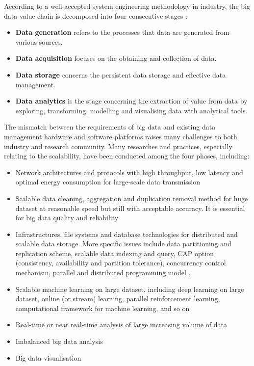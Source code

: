\documentclass[conference]{IEEEtran}
\providecommand{\tightlist}{%
  \setlength{\itemsep}{0pt}\setlength{\parskip}{0pt}
}
\begin{document}
According to a well-accepted system engineering methodology in industry,
the big data value chain is decomposed into four consecutive stages
\autocite{hu2014}:

\begin{itemize}
\tightlist
\item
  \textbf{Data generation} refers to the processes that data are
  generated from various sources.
\item
  \textbf{Data acquisition} focuses on the obtaining and collection of
  data.
\item
  \textbf{Data storage} concerns the persistent data storage and
  effective data management.
\item
  \textbf{Data analytics} is the stage concerning the extraction of
  value from data by exploring, transforming, modelling and visualising
  data with analytical tools.
\end{itemize}

The mismatch between the requirements of big data and existing data
management hardware and software platforms raises many challenges to
both industry and research community. Many researches and practices,
especially relating to the scalability, have been conducted among the
four phases, including:

\begin{itemize}
\tightlist
\item
  Network architectures and protocols with high throughput, low latency
  and optimal energy consumption for large-scale data transmission
  \autocite{hu2014}
\item
  Scalable data cleaning, aggregation and duplication removal method for
  huge dataset at reasonable speed but still with acceptable accuracy.
  It is essential for big data quality and reliability
  \autocite{hu2014,OUSSOUS2018431}
\item
  Infrastructures, file systems and database technologies for
  distributed and scalable data storage. More specific issues include
  data partitioning and replication scheme, scalable data indexing and
  query, CAP option (consistency, availability and partition tolerance),
  concurrency control mechanism, parallel and distributed programming
  model \autocite{hu2014,Gupta2016}.
\item
  Scalable machine learning on large dataset, including deep learning on
  large dataset, online (or stream) learning, parallel reinforcement
  learning, computational framework for machine learning, and so on
  \autocite{OUSSOUS2018431,Gupta2016}
\item
  Real-time or near real-time analysis of large increasing volume of
  data \autocite{OUSSOUS2018431}
\item
  Imbalanced big data analysis \autocite{OUSSOUS2018431}
\item
  Big data visualisation \autocite{hu2014}
\end{itemize}
\end{document}
